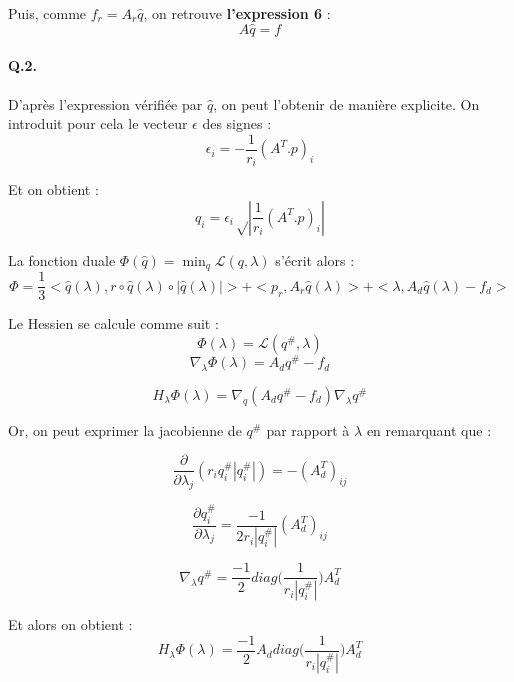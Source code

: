 \documentclass{article}
\begin{document}
        Puis, comme $f_r = A_r \hat{q}$, on retrouve \textbf{l'expression 6} :
        \[ A \hat{q} = f \]

        \paragraph{Q.2.} D'après l'expression vérifiée par $\hat{q}$, on peut l'obtenir de manière explicite.
        On introduit pour cela le vecteur $\epsilon$ des signes :
        \[\epsilon_i = -\frac{1}{r_i}(A^T.p)_i\]

        Et on obtient : 
        \[ \boxed{q_i = \epsilon_i \sqrt\left| \frac{1}{r_i}\left(A^T.p\right)_i\right|}\]

        La fonction duale $\Phi(\hat{q}) = \min_q \mathcal{L}(q, \lambda)$ s'écrit alors :
        \[\boxed{\Phi = \frac{1}{3}<\hat{q}(\lambda), r \circ \hat{q}(\lambda) \circ |\hat{q}(\lambda)|> + <p_r, A_r\hat{q}(\lambda)>
        + <\lambda, A_d\hat{q}(\lambda) - f_d>}\]
        
        Le Hessien se calcule comme suit :
        $$ \Phi (\lambda) = \mathcal{L} (q^{\#}, \lambda) $$
        $$ \nabla_{\lambda} \Phi (\lambda) = A_d q^{\#} - f_d $$

        $$ H_{\lambda} \Phi (\lambda) = \nabla_q (A_d q^{\#} - f_d) \nabla_{\lambda} q^{\#} $$



        Or, on peut exprimer la jacobienne de $q^{\#}$ par rapport à $\lambda$ en remarquant que :

        $$ \frac{\partial}{\partial \lambda_j} (r_i q_i^{\#} | q_i^{\#} |) = - (A_d^T)_{ij} $$

        $$ \frac{\partial q_i^{\#}}{\partial \lambda_j} = \frac{-1}{2 r_i |q_i^{\#}|} (A_d^T)_{ij} $$

        $$ \nabla_{\lambda} q^{\#} = \frac{-1}{2} diag\big(\frac{1}{r_i |q_i^{\#}|}\big) A_d^T $$



        Et alors on obtient :
        $$\boxed{H_{\lambda} \Phi (\lambda) = \frac{-1}{2} A_d diag\big(\frac{1}{r_i |q_i^{\#}|}\big) A_d^T} $$
\end{document}
